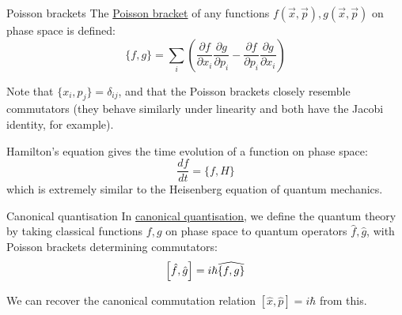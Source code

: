 \documentclass[../Main.tex]{subfiles}
\begin{document}
\begin{definition}{Poisson brackets}
    The \underline{Poisson bracket} of any functions $f(\vec{x}, \vec{p}), g(\vec{x}, \vec{p})$ on phase space is defined:
    \begin{equation*}
        \{f, g\} = \sum_i \left(\frac{\partial f}{\partial x_i} \frac{\partial g}{\partial p_i} - \frac{\partial f}{\partial p_i}\frac{\partial g}{\partial x_i}\right)
    \end{equation*}
\end{definition}
Note that $\{x_i, p_j\} = \delta_{ij}$, and that the Poisson brackets closely resemble commutators (they behave similarly under linearity and both have the Jacobi identity, for example).

Hamilton's equation gives the time evolution of a function on phase space:
\begin{equation*}
    \frac{df}{dt} = \{f, H\}
\end{equation*}
which is extremely similar to the Heisenberg equation of quantum mechanics.

\begin{definition}{Canonical quantisation}
    In \underline{canonical quantisation}, we define the quantum theory by taking classical functions $f, g$ on phase space to quantum operators $\hat{f}, \hat{g}$, with Poisson brackets determining commutators:
    \begin{equation*}
        \left[\hat{f}, \hat{g}\right] = i\hbar \widehat{\{f, g\}}
    \end{equation*}
\end{definition}
We can recover the canonical commutation relation $[\hat{x}, \hat{p}] = i\hbar$ from this.
\end{document}

